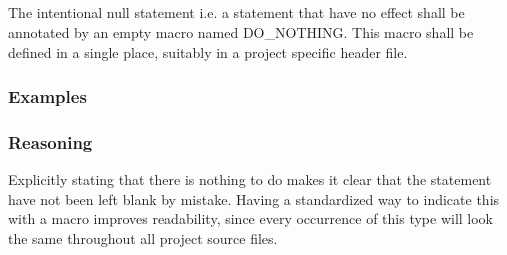 \subsection*{\codingRule{}}

The intentional null statement i.e. a statement that have no effect shall be annotated by an empty macro named DO\_NOTHING. This macro shall be defined in a single place, suitably in a project specific header file.

\subsubsection*{Examples}

\begin{minipage}[t]{\codelstwidth\linewidth}
    
\end{minipage}
\hfill
\begin{minipage}[t]{\codelstwidth\linewidth}
    
\end{minipage}

\subsubsection*{Reasoning}

Explicitly stating that there is nothing to do makes it clear that the statement have not been left blank by mistake. Having a standardized way to indicate this with a macro improves readability, since every occurrence of this type will look the same throughout all project source files.